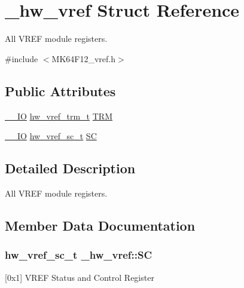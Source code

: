 \hypertarget{struct__hw__vref}{}\section{\+\_\+hw\+\_\+vref Struct Reference}
\label{struct__hw__vref}


All V\+R\+EF module registers.  




{\ttfamily \#include $<$M\+K64\+F12\+\_\+vref.\+h$>$}

\subsection*{Public Attributes}
\begin{DoxyCompactItemize}
\item 
\hyperlink{core__sc300_8h_aec43007d9998a0a0e01faede4133d6be}{\+\_\+\+\_\+\+IO} \hyperlink{union__hw__vref__trm}{hw\+\_\+vref\+\_\+trm\+\_\+t} \hyperlink{struct__hw__vref_a3345e06c59161eeb37a8f3e0de5e17b2}{T\+RM}
\item 
\hyperlink{core__sc300_8h_aec43007d9998a0a0e01faede4133d6be}{\+\_\+\+\_\+\+IO} \hyperlink{union__hw__vref__sc}{hw\+\_\+vref\+\_\+sc\+\_\+t} \hyperlink{struct__hw__vref_a214ff577b275f76dd5f8b9f8a2c3d7e7}{SC}
\end{DoxyCompactItemize}


\subsection{Detailed Description}
All V\+R\+EF module registers. 

\subsection{Member Data Documentation}
\subsubsection[{\texorpdfstring{SC}{SC}}]{ {\bf hw\+\_\+vref\+\_\+sc\+\_\+t} \+\_\+hw\+\_\+vref\+::\+SC}\hypertarget{struct__hw__vref_a214ff577b275f76dd5f8b9f8a2c3d7e7}{}\label{struct__hw__vref_a214ff577b275f76dd5f8b9f8a2c3d7e7}
\mbox{[}0x1\mbox{]} V\+R\+EF Status and Control Register 
